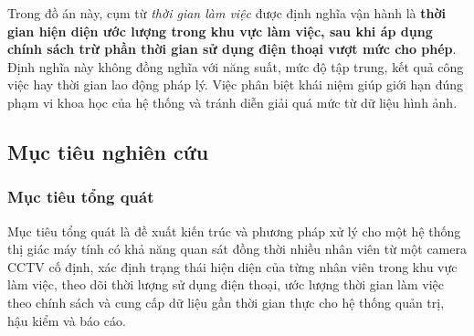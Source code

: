 Trong đồ án này, cụm từ \textit{thời gian làm việc} được định nghĩa vận hành là \textbf{thời gian hiện diện ước lượng trong khu vực làm việc, sau khi áp dụng chính sách trừ phần thời gian sử dụng điện thoại vượt mức cho phép}. Định nghĩa này không đồng nghĩa với năng suất, mức độ tập trung, kết quả công việc hay thời gian lao động pháp lý. Việc phân biệt khái niệm giúp giới hạn đúng phạm vi khoa học của hệ thống và tránh diễn giải quá mức từ dữ liệu hình ảnh.

\subsection{Mục tiêu nghiên cứu}
\subsubsection{Mục tiêu tổng quát}
Mục tiêu tổng quát là đề xuất kiến trúc và phương pháp xử lý cho một hệ thống thị giác máy tính có khả năng quan sát đồng thời nhiều nhân viên từ một camera CCTV cố định, xác định trạng thái hiện diện của từng nhân viên trong khu vực làm việc, theo dõi thời lượng sử dụng điện thoại, ước lượng thời gian làm việc theo chính sách và cung cấp dữ liệu gần thời gian thực cho hệ thống quản trị, hậu kiểm và báo cáo.

